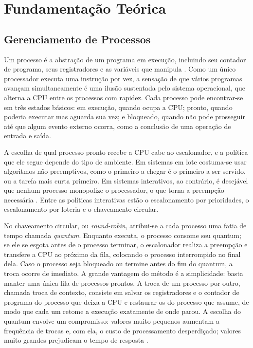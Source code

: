 \documentclass[
	12pt,				%
	openright,			%
	a4paper,			%
	english,			%
	french,				%
	spanish,			%
	brazilian,				%
	]{abntex2}
\begin{document}
\chapter{Fundamentação Teórica}
\section{Gerenciamento de Processos}
Um processo é a abstração de um programa em execução, incluindo seu contador de
programa, seus registradores e as variáveis que manipula \cite{tanenbaum2016}. Como um
único processador executa uma instrução por vez, a sensação de que vários programas
avançam simultaneamente é uma ilusão sustentada pelo sistema operacional, que alterna a
CPU entre os processos com rapidez. Cada processo pode encontrar-se em três estados
básicos: em execução, quando ocupa a CPU; pronto, quando poderia executar mas aguarda
sua vez; e bloqueado, quando não pode prosseguir até que algum evento externo ocorra,
como a conclusão de uma operação de entrada e saída.

A escolha de qual processo pronto recebe a CPU cabe ao escalonador, e a política que
ele segue depende do tipo de ambiente. Em sistemas em lote costuma-se usar algoritmos
não preemptivos, como o primeiro a chegar é o primeiro a ser servido, ou a tarefa mais
curta primeiro. Em sistemas interativos, ao contrário, é desejável que nenhum processo
monopolize o processador, o que torna a preempção necessária \cite{silberschatz2015}.
Entre as políticas interativas estão o escalonamento por prioridades, o escalonamento
por loteria e o chaveamento circular.

No chaveamento circular, ou \emph{round-robin}, atribui-se a cada processo uma fatia de
tempo chamada \emph{quantum}. Enquanto executa, o processo consome seu quantum; se ele
se esgota antes de o processo terminar, o escalonador realiza a preempção e transfere a
CPU ao próximo da fila, colocando o processo interrompido no final dela. Caso o processo
seja bloqueado ou termine antes do fim do quantum, a troca ocorre de imediato. A grande
vantagem do método é a simplicidade: basta manter uma única fila de processos prontos.
A troca de um processo por outro, chamada troca de contexto, consiste em salvar os
registradores e o contador de programa do processo que deixa a CPU e restaurar os do
processo que assume, de modo que cada um retome a execução exatamente de onde parou.
A escolha do quantum envolve um compromisso: valores muito pequenos aumentam a
frequência de trocas e, com ela, o custo de processamento desperdiçado; valores muito
grandes prejudicam o tempo de resposta \cite{tanenbaum2016}.
\end{document}

